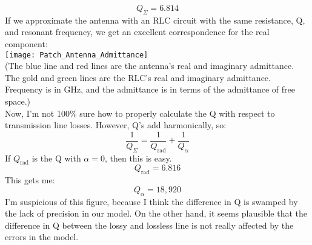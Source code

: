 \documentclass[final]{article}
\begin{document}
\[Q_\Sigma=6.814\]
If we approximate the antenna with an RLC circuit with the same resistance, Q, and resonant frequency, we get an excellent correspondence for the real component:\\
\texttt{[image: Patch\_Antenna\_Admittance]}\\
(The blue line and red lines are the antenna's real and imaginary admittance. The gold and green lines are the RLC's real and imaginary admittance. Frequency is in GHz, and the admittance is in terms of the admittance of free space.)\\
Now, I'm not 100\% sure how to properly calculate the Q with respect to transmission line losses. However, Q's add harmonically, so:
\[\frac{1}{Q_\Sigma}=\frac{1}{Q_\text{rad}}+\frac{1}{Q_\alpha}\]
If \(Q_\text{rad}\) is the Q with \(\alpha=0\), then this is easy.
\[Q_\text{rad}=6.816\]
This gets me:
\[Q_\alpha=18,920\]
I'm suspicious of this figure, because I think the difference in Q is swamped by the lack of precision in our model. On the other hand, it seems plausible that the difference in Q between the lossy and lossless line is not really affected by the errors in the model.
\end{document}

